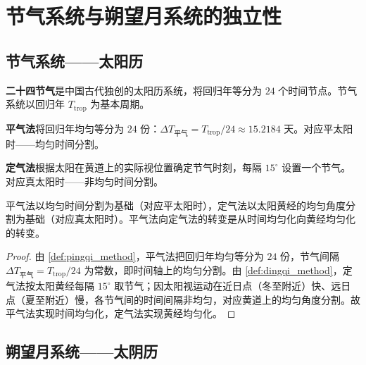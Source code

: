 \section{节气系统与朔望月系统的独立性}
\label{sec:calendar_independence}

\subsection{节气系统——太阳历}

\begin{definition}[节气系统]\label{def:solar_term_system}
\textbf{二十四节气}是中国古代独创的太阳历系统，将回归年等分为 \(24\) 个时间节点。节气系统以回归年 \(T_{\text{trop}}\) 为基本周期。
\end{definition}

\begin{definition}[平气法]\label{def:pingqi_method}
\textbf{平气法}将回归年均匀等分为 \(24\) 份：\(\Delta T_{\text{平气}}=T_{\text{trop}}/24\approx 15.2184\) 天。对应平太阳时——均匀时间分割。
\end{definition}

\begin{definition}[定气法]\label{def:dingqi_method}
\textbf{定气法}根据太阳在黄道上的实际视位置确定节气时刻，每隔 \(15^\circ\) 设置一个节气。对应真太阳时——非均匀时间分割。
\end{definition}

\begin{proposition}[平气法与定气法的对比]\label{prop:pingqi_dingqi_comparison}
平气法以均匀时间分割为基础（对应平太阳时），定气法以太阳黄经的均匀角度分割为基础（对应真太阳时）。平气法向定气法的转变是从时间均匀化向黄经均匀化的转变。
\end{proposition}

\begin{proof}
由 \cref{def:pingqi_method}，平气法把回归年均匀等分为 \(24\) 份，节气间隔 \(\Delta T_{\text{平气}}=T_{\text{trop}}/24\) 为常数，即时间轴上的均匀分割。由 \cref{def:dingqi_method}，定气法按太阳黄经每隔 \(15^\circ\) 取节气；因太阳视运动在近日点（冬至附近）快、远日点（夏至附近）慢，各节气间的时间间隔非均匀，对应黄道上的均匀角度分割。故平气法实现时间均匀化，定气法实现黄经均匀化。
\end{proof}

\subsection{朔望月系统——太阴历}

